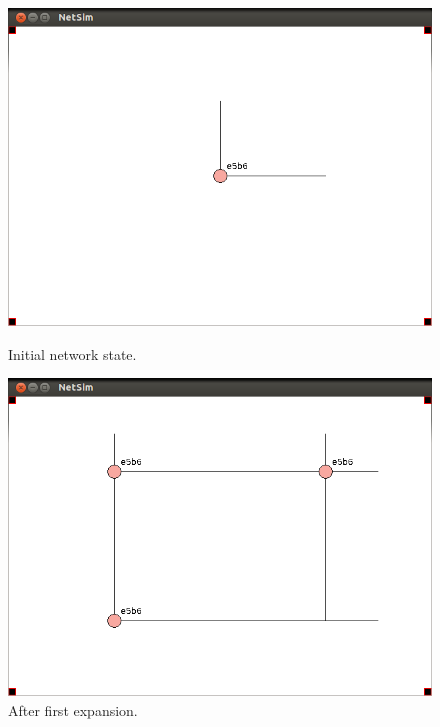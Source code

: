 \documentclass[ %
                    author={Luke Murray},
                supervisor={Dr. Simon Hollis},
                     title={Shadow Peer-to-Peer Networks},
                  subtitle={},
                    degree={MEng},
                      year={2013} ]{thesis}
\begin{document}
\begin{figure}[h]
    \centering
    \begin{minipage}[b]{0.45\linewidth}
        \centering
        \includegraphics[width=\linewidth]{sim_pics/expand_1.png}
        \caption{Initial network state.}
        \label{sim_expand1}
    \end{minipage}
    \hspace{0.5cm}
    \begin{minipage}[b]{0.45\linewidth}
        \centering
        \includegraphics[width=\linewidth]{sim_pics/expand_2.png}
        \caption{After first expansion.}
        \label{sim_expand2}
    \end{minipage}
\end{figure}
\end{document}
